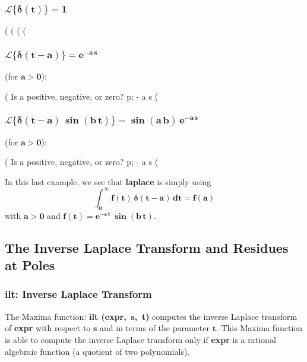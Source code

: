 \documentclass[12pt]{article}
\begin{document}
\subsubsection*{$\mathbf{\mathcal{L} \{\boldsymbol{\delta}(t)\} = 1}$}
\begin{myVerbatim}
(%
(%
(%
(%
\end{myVerbatim}
\subsubsection*{$\mathbf{\mathcal{L} \{\boldsymbol{\delta}(t-a)\} = e^{-a\,s}}$}
 (for $\mathbf{a > 0}$):
\begin{myVerbatim}
(%
Is  a  positive, negative, or zero?
p;
                                      - a s
(%
\end{myVerbatim}
\subsubsection*{$\mathbf{\mathcal{L} \{\boldsymbol{\delta}(t-a) \,\boldsymbol{\sin}(b\,t) \} =
 \boldsymbol{\sin}(a\,b)\,e^{-a\,s}}$}
 (for $\mathbf{a > 0}$):
\begin{myVerbatim}
(%
Is  a  positive, negative, or zero?
p;
                                          - a s
(%
\end{myVerbatim}
In this last example, we see that \textbf{laplace} is simply using
\begin{equation}
\mathbf{\int_{0}^{\infty} f(t)\,\boldsymbol{\delta}(t-a)\,dt = f(a) }
\end{equation}
with $\mathbf{a > 0}$ and  $\mathbf{f(t) = e^{-s\,t}\,\boldsymbol{\sin}(b\,t) }$.
\subsection{The Inverse Laplace Transform and Residues at Poles }
\subsubsection{\textbf{ilt}: Inverse Laplace Transform}
The Maxima function: \textbf{ilt (expr,\, s,\, t)} computes the inverse Laplace
   transform of \textbf{expr} with respect to $\mathbf{s}$ and in terms of the parameter $\mathbf{t}$.
This Maxima function is able to compute the inverse Laplace transform only if
   \textbf{expr} is a rational algebraic function (a quotient of two
   polynomials).\\
\end{document}
